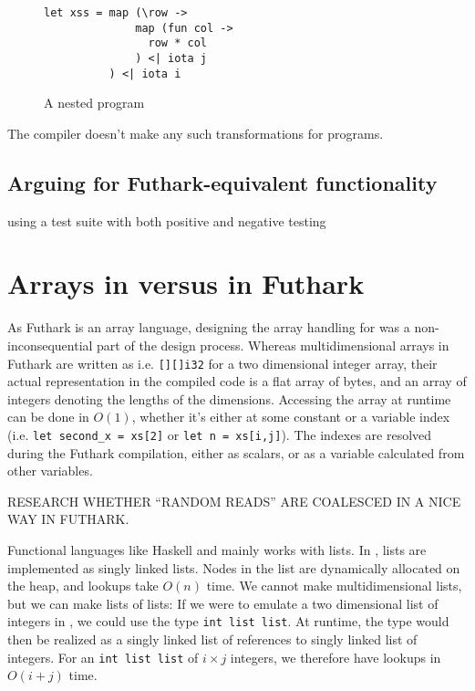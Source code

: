 \begin{figure}[h]
  \centering
\begin{verbatim}
let xss = map (\row ->
              map (fun col ->
                row * col
              ) <| iota j
          ) <| iota i
\end{verbatim}
  \caption{A nested \fshark{} program}
  \label{fig:fsharpnested}
\end{figure}

The \fsharp{} compiler doesn't make any such transformations for \fshark{} programs.

\subsection*{Arguing for Futhark-equivalent functionality}
using a test suite with both positive and negative testing

\section{Arrays in \fsharp{} versus in Futhark}
As Futhark is an array language, designing the array handling for \fshark{} was
a non-inconsequential part of the design process.
Whereas multidimensional arrays in Futhark are written as i.e. \texttt{[][]i32}
for a two dimensional integer array, their actual representation in the compiled
code is a flat array of bytes, and an array of integers denoting the lengths of
the dimensions.
Accessing the array at runtime can be done in $O(1)$, whether it's
either at some constant or a variable index (i.e. \texttt{let second\_x = xs[2]} or \texttt{let n = xs[i,j]}).
The indexes are resolved during the Futhark compilation, either as scalars, or
as a variable calculated from other variables.

RESEARCH WHETHER ``RANDOM READS'' ARE COALESCED IN A NICE WAY IN FUTHARK.

Functional languages like Haskell and \fsharp{} mainly works with lists.
In \fsharp{}, lists are implemented as singly linked lists. Nodes in the
list are dynamically allocated on the heap, and lookups take $O(n)$ time.
We cannot make multidimensional lists, but we can make lists of lists: If we
were to emulate a two dimensional list of integers in \fsharp{}, we could use
the type \texttt{int list list}. At runtime, the type would then be realized as
a singly linked list of references to singly linked list of integers.
For an \texttt{int list list} of $i \times j$ integers, we therefore have
lookups in $O(i+j)$ time.

